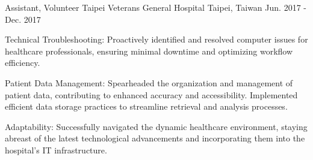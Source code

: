 

\begin{cventries}

  \cventry
    {Assistant, Volunteer} %
    {Taipei Veterans General Hospital} %
    {Taipei, Taiwan} %
    {Jun. 2017 - Dec. 2017} %
    {
      \begin{cvitems} %
        \item {Technical Troubleshooting: Proactively identified and resolved computer issues for healthcare professionals, ensuring minimal downtime and optimizing workflow efficiency.}
        \item {Patient Data Management: Spearheaded the organization and management of patient data, contributing to enhanced accuracy and accessibility. Implemented efficient data storage practices to streamline retrieval and analysis processes.}
        \item {Adaptability: Successfully navigated the dynamic healthcare environment, staying abreast of the latest technological advancements and incorporating them into the hospital's IT infrastructure.}
      \end{cvitems}
    }


\end{cventries}

